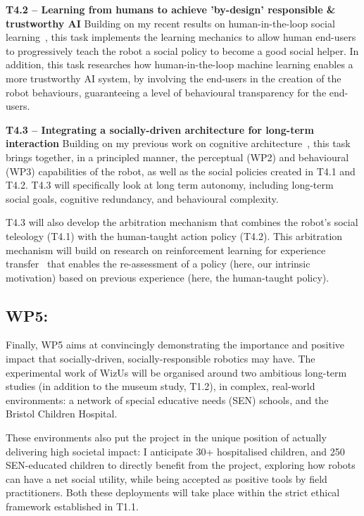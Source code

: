 \documentclass[11pt,a4paper]{report}
\newcommand{\project}{WizUs\xspace}
\begin{document}
\textbf{T4.2 -- Learning from humans to achieve 'by-design' responsible \&
trustworthy AI} Building on my recent results on human-in-the-loop
social learning~\cite{senft2017supervised,senft2019teaching,winkle2020couch}, this task
implements the learning mechanics to allow human end-users to progressively
teach the robot a social policy to become a good social helper.
In addition, this task researches how human-in-the-loop machine learning enables a more
trustworthy AI system, by involving the end-users in the creation of the robot
behaviours, guaranteeing a level of behavioural transparency for the end-users.

\textbf{T4.3 -- Integrating a socially-driven architecture for long-term
interaction} Building on my previous work on cognitive
architecture~\cite{lemaignan2017artificial}, this task brings together, in a
principled manner, the perceptual (WP2) and behavioural
(WP3) capabilities of the robot, as well as the social policies created in T4.1 and
T4.2. T4.3 will specifically look at long term autonomy, including long-term
social goals, cognitive redundancy, and behavioural complexity.

T4.3 will also develop the arbitration mechanism that combines the robot's
social teleology (T4.1) with the human-taught action policy (T4.2). This
arbitration mechanism will build on research on reinforcement learning for
experience transfer~\cite{madden2004transfer} that enables the re-assessment of
a policy (here, our intrinsic motivation) based on previous experience (here,
the human-taught policy).

\subsection{WP5: \textbf{\wpFive}}

Finally, WP5 aims at convincingly demonstrating the importance and positive impact that
socially-driven, socially-responsible robotics may have. The experimental work
of \project will be organised around two ambitious long-term studies (in
addition to the museum study, T1.2), in complex, real-world environments: a
network of special educative needs (SEN) schools, and the Bristol Children Hospital.

These environments also put the project in the unique position of actually
delivering high societal impact: I anticipate 30+ hospitalised children, and 250
SEN-educated children to directly benefit from the project, exploring how robots
can have a net social utility, while being accepted as positive tools by field
practitioners. Both these deployments will take place within the strict ethical
framework established in T1.1.
\end{document}
